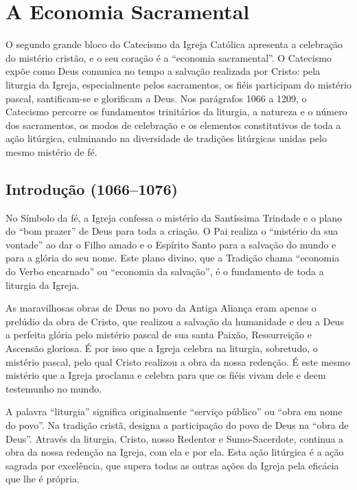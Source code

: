 \chapter{A Economia Sacramental}

O segundo grande bloco do Catecismo da Igreja Católica apresenta a celebração do mistério cristão, e o seu coração é a ``economia sacramental''. O Catecismo expõe como Deus comunica no tempo a salvação realizada por Cristo: pela liturgia da Igreja, especialmente pelos sacramentos, os fiéis participam do mistério pascal, santificam-se e glorificam a Deus. Nos parágrafos 1066 a 1209, o Catecismo percorre os fundamentos trinitários da liturgia, a natureza e o número dos sacramentos, os modos de celebração e os elementos constitutivos de toda a ação litúrgica, culminando na diversidade de tradições litúrgicas unidas pelo mesmo mistério de fé.

\section{Introdução (1066--1076)}

No Símbolo da fé, a Igreja confessa o mistério da Santíssima Trindade e o plano do ``bom prazer'' de Deus para toda a criação. O Pai realiza o ``mistério da sua vontade'' ao dar o Filho amado e o Espírito Santo para a salvação do mundo e para a glória do seu nome. Este plano divino, que a Tradição chama ``economia do Verbo encarnado'' ou ``economia da salvação'', é o fundamento de toda a liturgia da Igreja.

As maravilhosas obras de Deus no povo da Antiga Aliança eram apenas o prelúdio da obra de Cristo, que realizou a salvação da humanidade e deu a Deus a perfeita glória pelo mistério pascal de sua santa Paixão, Ressurreição e Ascensão gloriosa. É por isso que a Igreja celebra na liturgia, sobretudo, o mistério pascal, pelo qual Cristo realizou a obra da nossa redenção. É este mesmo mistério que a Igreja proclama e celebra para que os fiéis vivam dele e deem testemunho no mundo.

A palavra ``liturgia'' significa originalmente ``serviço público'' ou ``obra em nome do povo''. Na tradição cristã, designa a participação do povo de Deus na ``obra de Deus''. Através da liturgia, Cristo, nosso Redentor e Sumo-Sacerdote, continua a obra da nossa redenção na Igreja, com ela e por ela. Esta ação litúrgica é a ação sagrada por excelência, que supera todas as outras ações da Igreja pela eficácia que lhe é própria.

